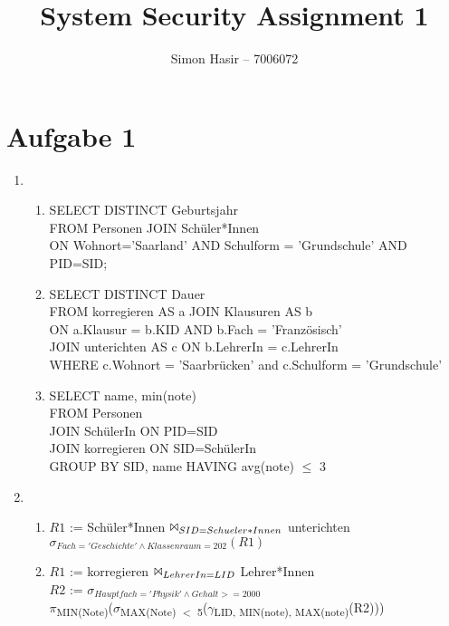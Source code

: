 \documentclass[12pt]{article}
\title{System Security Assignment 1}
\author{Simon Hasir -- 7006072}
\begin{document}
    \maketitle
    \section*{Aufgabe 1}
    \begin{enumerate}[label=(\alph*)]
    \item \begin{enumerate}[label=(\roman*)]
        \item SELECT DISTINCT Geburtsjahr \\
        FROM Personen JOIN Schüler*Innen \\
        ON Wohnort='Saarland' AND Schulform = 'Grundschule' AND PID=SID;
        \item SELECT DISTINCT Dauer\\
        FROM korregieren AS a JOIN Klausuren AS b\\
         ON a.Klausur = b.KID AND b.Fach = 'Französisch'\\
        JOIN unterichten AS c ON b.LehrerIn = c.LehrerIn \\
        WHERE c.Wohnort = 'Saarbrücken' and c.Schulform = 'Grundschule'
        \item SELECT name, min(note) \\
        FROM Personen\\
        JOIN SchülerIn ON PID=SID \\
        JOIN korregieren ON  SID=SchülerIn\\
        GROUP BY SID, name HAVING avg(note) $\le$ 3 
    \end{enumerate} %
    \item \begin{enumerate}[label=(\roman*)]
        \item $R1$ := Schüler*Innen $\Bowtie _{SID= Schueler*Innen}$ unterichten\\
        $\sigma_{Fach='Geschichte' \land Klassenraum=202} (R1)$
        \item $R1$ := korregieren $\Bowtie_{LehrerIn=LID}$ Lehrer*Innen\\
        $R2$ := $\sigma_{Hauptfach='Physik' \land Gehalt>= 2000}$\\
        $\pi$\textsubscript{MIN(Note)}($\sigma$\textsubscript{MAX(Note) $<$ 5}($\gamma$\textsubscript{LID, MIN(note), MAX(note)}(R2)))
    \end{enumerate}
    \end{enumerate}
\end{document}
